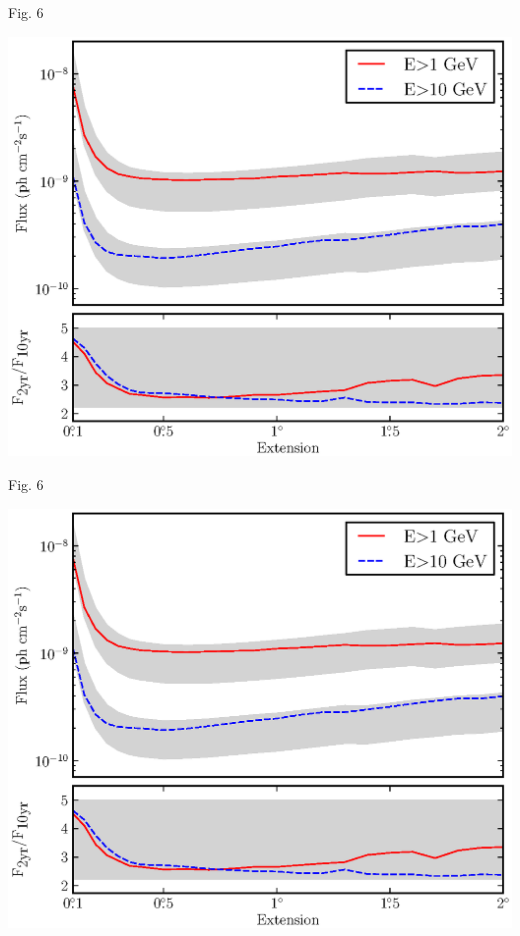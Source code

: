 \documentclass[12pt]{beamer}
\begin{document}
\begin{frame}{Fig. 6}
  \begin{center}
    \includegraphics[scale=0.5]{../paper/mc_plots/time_sensitivity_color.eps}
  \end{center}
\end{frame}

\begin{frame}{Fig. 6}
  \begin{center}
    \includegraphics[scale=0.5]{../paper/mc_plots/time_sensitivity_color.eps}
  \end{center}
\end{frame}
\end{document}
